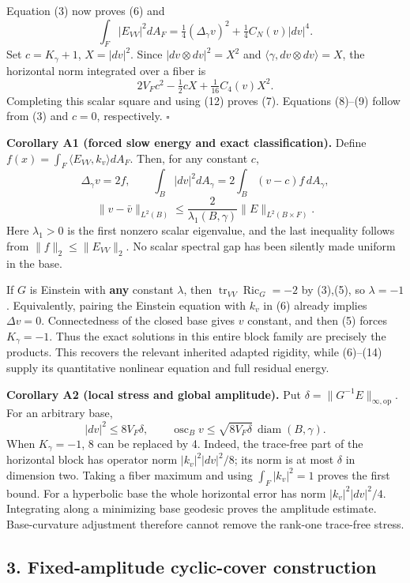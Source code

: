 \documentclass[
  11pt,
]{article}
\begin{document}
Equation (3) now proves (6) and \[
 \int_F|E_{VV}|^2dA_F
           =\tfrac14(\Delta_\gamma v)^2
                          +\tfrac14C_N(v)|dv|^4.
 \tag{12}
\] Set \(c=K_\gamma+1\), \(X=|dv|^2\). Since \(|dv\otimes dv|^2=X^2\)
and \(\langle\gamma,dv\otimes dv\rangle=X\), the horizontal norm
integrated over a fiber is \[
 2V_Fc^2-\tfrac12cX+\tfrac1{16}C_4(v)X^2.
 \tag{13}
\] Completing this scalar square and using (12) proves (7). Equations
(8)--(9) follow from (3) and \(c=0\), respectively. \(\square\)

\textbf{Corollary A1 (forced slow energy and exact classification).}
Define \(f(x)=\int_F\langle E_{VV},k_v\rangle dA_F\). Then, for any
constant \(c\), \[
 \Delta_\gamma v=2f,\qquad
 \int_B|dv|^2dA_\gamma=2\int_B(v-c)f\,dA_\gamma,
\] \[
 \|v-\bar v\|_{L^2(B)}
       \le\frac{2}{\lambda_1(B,\gamma)}\|E\|_{L^2(B\times F)}.
 \tag{14}
\] Here \(\lambda_1>0\) is the first nonzero scalar eigenvalue, and the
last inequality follows from \(\|f\|_2\le\|E_{VV}\|_2\). No scalar
spectral gap has been silently made uniform in the base.

If \(G\) is Einstein with \textbf{any} constant \(\lambda\), then
\(\operatorname{tr}_{VV}\operatorname{Ric}_G=-2\) by (3),(5), so
\(\lambda=-1\). Equivalently, pairing the Einstein equation with \(k_v\)
in (6) already implies \(\Delta v=0\). Connectedness of the closed base
gives \(v\) constant, and then (5) forces \(K_\gamma=-1\). Thus the
exact solutions in this entire block family are precisely the products.
This recovers the relevant inherited adapted rigidity, while (6)--(14)
supply its quantitative nonlinear equation and full residual energy.

\textbf{Corollary A2 (local stress and global amplitude).} Put
\(\delta=\|G^{-1}E\|_{\infty,\mathrm{op}}\). For an arbitrary base, \[
 |dv|^2\le8V_F\delta,
 \qquad
 \operatorname{osc}_B v\le\sqrt{8V_F\delta}\,
                                  \operatorname{diam}(B,\gamma).
 \tag{15}
\] When \(K_\gamma=-1\), 8 can be replaced by 4. Indeed, the trace-free
part of the horizontal block has operator norm \(|k_v|^2|dv|^2/8\); its
norm is at most \(\delta\) in dimension two. Taking a fiber maximum and
using \(\int_F|k_v|^2=1\) proves the first bound. For a hyperbolic base
the whole horizontal error has norm \(|k_v|^2|dv|^2/4\). Integrating
along a minimizing base geodesic proves the amplitude estimate.
Base-curvature adjustment therefore cannot remove the rank-one
trace-free stress.

\hypertarget{fixed-amplitude-cyclic-cover-construction}{%
\subsection{3. Fixed-amplitude cyclic-cover
construction}\label{fixed-amplitude-cyclic-cover-construction}}
\end{document}
